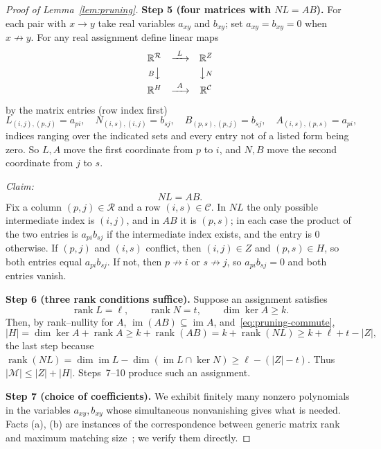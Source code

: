 \documentclass[11pt]{article}
\theoremstyle{remark}
\newcommand{\abs}[1]{\lvert #1\rvert}
\DeclareMathOperator{\rank}{rank}
\DeclareMathOperator{\im}{im}
\newcommand{\R}{\mathbb R}
\newcommand{\step}[1]{\par\smallskip\noindent\textbf{Step #1.}}
\newcommand{\cR}{\mathcal R}
\newcommand{\cC}{\mathcal C}
\newcommand{\cM}{\mathcal M}
\begin{document}
\begin{proof}[Proof of Lemma~\ref{lem:pruning}]
\step{5 (four matrices with $NL=AB$)} For each pair with $x\to y$ take real
variables $a_{xy}$ and $b_{xy}$; set $a_{xy}=b_{xy}=0$ when $x\not\to y$. For
any real assignment define linear maps
\[
 \begin{array}{ccc}
 \R^{\cR}&\xrightarrow{\ L\ }&\R^Z\\[3pt]
 {\scriptstyle B}\big\downarrow&&\big\downarrow{\scriptstyle N}\\[3pt]
 \R^H&\xrightarrow{\ A\ }&\R^{\cC}
 \end{array}
\]
by the matrix entries (row index first)
\begin{equation}\label{eq:pruning-maps}
 L_{(i,j),(p,j)}=a_{pi},\quad
 N_{(i,s),(i,j)}=b_{sj},\quad
 B_{(p,s),(p,j)}=b_{sj},\quad
 A_{(i,s),(p,s)}=a_{pi},
\end{equation}
indices ranging over the indicated sets and every entry not of a listed form
being zero. So $L,A$ move the first coordinate from $p$ to $i$, and $N,B$ move
the second coordinate from $j$ to $s$.

\emph{Claim:}
\begin{equation}\label{eq:pruning-commute}
 NL=AB.
\end{equation}
Fix a column $(p,j)\in\cR$ and a row $(i,s)\in\cC$. In $NL$ the only possible
intermediate index is $(i,j)$, and in $AB$ it is $(p,s)$; in each case the
product of the two entries is $a_{pi}b_{sj}$ if the intermediate index exists,
and the entry is $0$ otherwise. If $(p,j)$ and $(i,s)$ conflict, then
$(i,j)\in Z$ and $(p,s)\in H$, so both entries equal $a_{pi}b_{sj}$. If not,
then $p\not\to i$ or $s\not\to j$, so $a_{pi}b_{sj}=0$ and both entries vanish.

\step{6 (three rank conditions suffice)} Suppose an assignment satisfies
\[
 \rank L=\ell,\qquad\rank N=t,\qquad\dim\ker A\geq k.
\]
Then, by rank--nullity for $A$, $\im(AB)\subseteq\im A$,
and~\eqref{eq:pruning-commute},
\begin{equation}\label{eq:pruning-rank-bound}
 \abs H=\dim\ker A+\rank A\geq k+\rank(AB)=k+\rank(NL)\geq k+\ell+t-\abs Z,
\end{equation}
the last step because
$\rank(NL)=\dim\im L-\dim(\im L\cap\ker N)\geq\ell-(\abs Z-t)$. Thus
$\abs{\cM}\le\abs Z+\abs H$. Steps~7--10 produce such an assignment.

\step{7 (choice of coefficients)} We exhibit finitely many nonzero polynomials
in the variables $a_{xy},b_{xy}$ whose simultaneous nonvanishing gives what is
needed. Facts (a), (b) are instances of the correspondence between generic
matrix rank and maximum matching
size~\cite[Section~5, Theorem~1]{Edmonds1967}; we verify them directly.


\end{proof}
\end{document}
